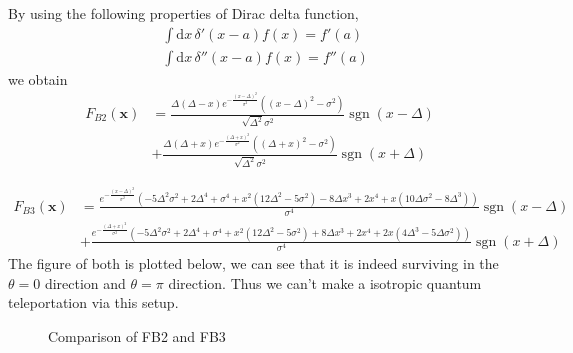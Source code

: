\documentclass[a4paper,12pt]{article}
\begin{document}
By using the following properties of Dirac delta function,
\begin{align}
    &\int \mathrm{d} x \, \delta '(x-a) f(x) = f'(a)\\
    &\int \mathrm{d} x \, \delta ''(x-a) f(x) = f''(a)
\end{align}
we obtain 
\begin{align*}
    F_{B2}(\mathbf{x}) &= \frac{\Delta  (\Delta -x) e^{-\frac{(x-\Delta )^2}{\sigma ^2}} \left((x-\Delta )^2-\sigma ^2\right)}{\sqrt{\Delta ^2} \sigma ^2}\operatorname{sgn}(x - \Delta)\\ &+\frac{\Delta  (\Delta +x) e^{-\frac{(\Delta +x)^2}{\sigma ^2}} \left((\Delta +x)^2-\sigma ^2\right)}{\sqrt{\Delta ^2} \sigma ^2} \operatorname{sgn}(x + \Delta)
\end{align*}

{\footnotesize\begin{align*}
    F_{B3}(\mathbf{x}) &= \frac{e^{-\frac{(x-\Delta )^2}{\sigma ^2}} \left(-5 \Delta ^2 \sigma ^2+2 \Delta ^4+\sigma ^4+x^2 \left(12 \Delta ^2-5 \sigma ^2\right)-8 \Delta  x^3+2 x^4+x \left(10 \Delta  \sigma ^2-8 \Delta ^3\right)\right)}{\sigma ^4}\operatorname{sgn}(x - \Delta)\\
    &+\frac{e^{-\frac{(\Delta +x)^2}{\sigma ^2}} \left(-5 \Delta ^2 \sigma ^2+2 \Delta ^4+\sigma ^4+x^2 \left(12 \Delta ^2-5 \sigma ^2\right)+8 \Delta  x^3+2 x^4+2 x \left(4 \Delta ^3-5 \Delta  \sigma ^2\right)\right)}{\sigma ^4}\operatorname{sgn}(x + \Delta) 
\end{align*}}
The figure of both is plotted below, we can see that it is indeed surviving in the \(\theta = 0\) direction and \(\theta = \pi\) direction. Thus we can't make a isotropic quantum teleportation via this setup.

\begin{figure}[htbp]
    \centering
    \hfill
    \caption{Comparison of FB2 and FB3}
    \label{fig:combined}
\end{figure}

\appendix

\acknowledgments






\end{document}

